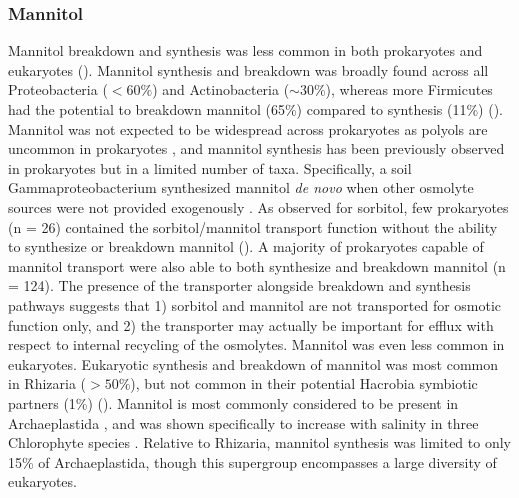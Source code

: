 \documentclass[utf8]{frontiersSCNS} %
\begin{document}
\subsubsection*{Mannitol}
Mannitol breakdown and synthesis was less common in both prokaryotes and eukaryotes (). Mannitol synthesis and breakdown was broadly found across all Proteobacteria ($< 60\%$) and Actinobacteria ($\sim 30\%$), whereas more Firmicutes had the potential to breakdown mannitol (65\%) compared to synthesis (11\%) (). Mannitol was not expected to be widespread across prokaryotes as polyols are uncommon in prokaryotes \citep{Empadinhas2008}, and mannitol synthesis has been previously observed in prokaryotes but in a limited number of taxa. Specifically, a soil Gammaproteobacterium synthesized mannitol \emph{de novo} when other osmolyte sources were not provided exogenously \citep{Sand2013}. As observed for sorbitol, few prokaryotes (n = 26) contained the sorbitol/mannitol transport function without the ability to synthesize or breakdown mannitol (). A majority of prokaryotes capable of mannitol transport were also able to both synthesize and breakdown mannitol (n = 124). The presence of the transporter alongside breakdown and synthesis pathways suggests that 1) sorbitol and mannitol are not transported for osmotic function only, and 2) the transporter may actually be important for efflux with respect to internal recycling of the osmolytes. Mannitol was even less common in eukaryotes. Eukaryotic synthesis and breakdown of mannitol was most common in Rhizaria ($> 50\%$), but not common in their potential Hacrobia symbiotic partners (1\%) (). Mannitol is most commonly considered to be present in Archaeplastida \citep{Kirst1989}, and was shown specifically to increase with salinity in three Chlorophyte species \citep{Dickson1987.2}. Relative to Rhizaria, mannitol synthesis was limited to only 15\% of Archaeplastida, though this supergroup encompasses a large diversity of eukaryotes.
\end{document}
